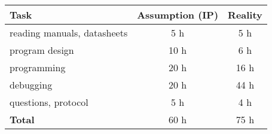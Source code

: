 \documentclass[12pt,a4paper,titlepage,oneside]{article}
\begin{document}
\begin{tabular}{|l|c|c|}\hline
	Task & Assumption (IP) & Reality \\ \hline

	reading manuals, datasheets &  5 h &  5 h\\
	program design              & 10 h &  6 h\\
	programming                 & 20 h & 16 h\\
	debugging                   & 20 h & 44 h\\
	questions, protocol         &  5 h &  4 h\\ \hline

	\textbf{Total}              & 60 h & 75 h\\ \hline
\end{tabular}


\newpage
\end{document}
